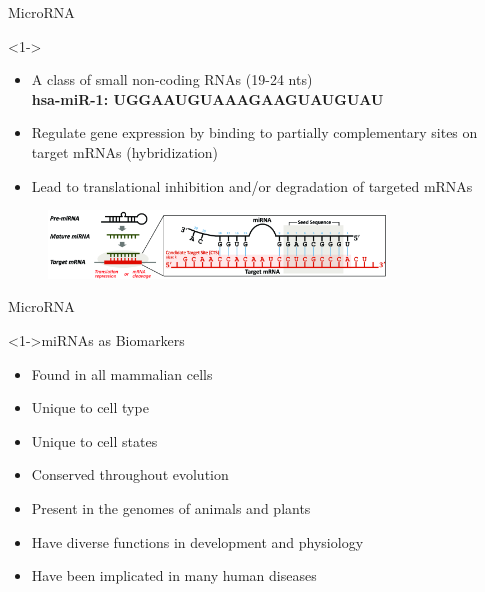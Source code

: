 \documentclass{beamer}
\begin{document}
\begin{frame}{MicroRNA}
	\begin{exampleblock}
		<1->{}
		\begin{itemize}
			\item A class of small non-coding RNAs (19-24 nts)\\
			      \textbf{hsa-miR-1: UGGAAUGUAAAGAAGUAUGUAU
			      	}
			      	\item Regulate gene expression by binding to partially complementary sites
			      on target mRNAs (hybridization)
			      \item Lead to translational inhibition and/or degradation of targeted mRNAs
		\end{itemize}
	\end{exampleblock}
	\begin{figure}[ht!]
		\centering
			\includegraphics[width=0.8\textwidth]{images/mirna-target.png}
		\end{figure}
\end{frame}


\begin{frame}{MicroRNA}
	\begin{exampleblock}
		<1->{miRNAs as Biomarkers}
		\begin{itemize}
			\item Found in all mammalian cells
			\item Unique to cell type
			\item Unique to cell states
		\end{itemize}
	\end{exampleblock}
	\begin{itemize}
\item Conserved throughout evolution
\item Present in the genomes of animals and plants  
\item Have diverse functions in development and physiology
\item Have been implicated in many human diseases
\end{itemize}


\end{frame}
\end{document}
